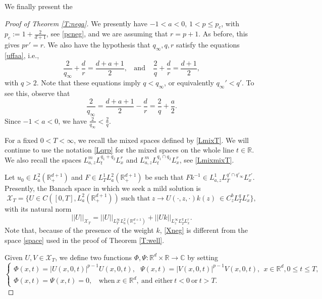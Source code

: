 \documentclass[11pt,letter]{amsart}
\def \RN {\mathbb{R}_+^{d+1}}
\def \R {\mathbb{R}}
\newcommand{\Rd}{\mathbb R^d}
\numberwithin{equation}{section}
\newcommand{\XT}{\mathcal{X}_T}
\newcommand{\C}{\mathbb{C}}
\numberwithin{equation}{section}
\begin{document}
We finally present the 

\begin{proof}[Proof of Theorem \ref{T:nega}]

We presently have $-1<a<0$, $1<p\le p_c$, with $p_c := 1 + \frac{2}{d+1}$, see \eqref{pcneg}, and we are assuming that $r=p+1$. As before, this gives $p r' = r$. We also have the hypothesis that $q_\infty, q, r$ satisfy the equations \eqref{uffaa}, i.e.,
\[
\frac{2}{q_\infty} + \frac dr = \frac{d+a+1}2,\ \ \ \ \text{and}\ \ \ \ \ \frac 2{q} + \frac dr = \frac{d+1}2, 
\]
with $q>2$.
Note that these equations imply $q<q_\infty$, or equivalently $q_\infty'<q'$. To see this, observe that
\[
\frac{2}{q_\infty} = \frac{d+a+1}2 - \frac dr  = \frac 2q + \frac a2.
\]
Since $-1<a<0$, we have $\frac{2}{q_\infty} < \frac{2}{q}$.



 For a fixed $0<T<\infty$, we recall the mixed spaces defined by \eqref{LmixT}. We will continue to use the notation \eqref{Lqrp} for the mixed spaces on the whole line $t\in \R$. We also recall the spaces $L^m_{a,z} L^{q_1+q_2}_t L^r_x$ and $L^m_{a,z} L^{q_1\cap q_2}_t L^r_x $, see \eqref{LmixmixT}. 
 
Let $u_0\in L^2_a(\RN)$ and $F\in L^1_T L^2_a(\RN)$ be such that 
$F  k^{-1}\in L^1_{a,z} L^{q'\cap q'_\infty}_T L^{r'}_x $. Presently, the Banach space in which we seek a mild solution is
\begin{equation}\label{Xneg}
\XT = \{U\in C([0,T],L^2_a(\RN))\ \text{such that}\  z\to U(\cdot,z,\cdot) k(z)\ \in C^b_z L^q_T L^r_x \},
\end{equation}
with its natural norm
\begin{equation}\label{normU}
||U||_{\XT} = ||U||_{L^\infty_T L^2_a(\RN)}  + ||U k||_{L^\infty_z L^q_T L^r_x }.
\end{equation}
Note that, because of the presence of the weight $k$,  \eqref{Xneg} is different from the space \eqref{space} used in the proof of Theorem \ref{T:well}.

Given $U, V\in \XT$, we define two functions $\Phi, \Psi:\Rd\times \R\to \C$ by setting
\begin{equation}\label{F}  
\begin{cases}
\Phi(x,t) = |U(x,0,t)|^{p-1} U(x,0,t), \ \ \ \Psi(x,t) = |V(x,0,t)|^{p-1} V(x,0,t),\ \ x\in \Rd, 0\le t\le T,
\\
\Phi(x,t) = \Psi(x,t) = 0,\ \ \ \ \text{when}\ x\in \Rd,\ \text{and either}\ t<0\ \text{or}\ t>T.
\end{cases}
\end{equation}


\end{proof}
\end{document}
